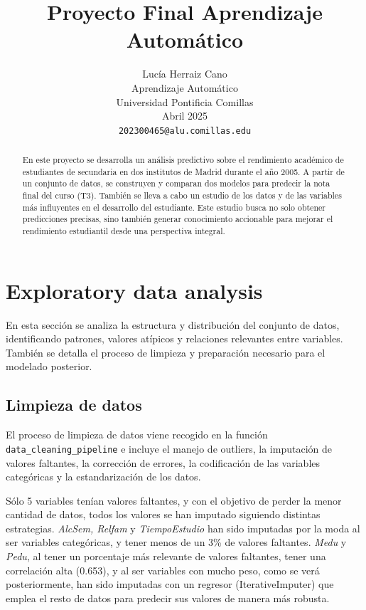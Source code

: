 \documentclass{article}
\title{Proyecto Final Aprendizaje Automático}
\author{%
    Lucía Herraiz Cano\\
    Aprendizaje Automático\\
    Universidad Pontificia Comillas\\
    Abril 2025\\
    \texttt{202300465@alu.comillas.edu} \\
}
\begin{document}
\maketitle


\begin{abstract}
  En este proyecto se desarrolla un análisis predictivo sobre el rendimiento 
  académico de estudiantes de secundaria en dos institutos de Madrid durante 
  el año 2005. A partir de un conjunto de datos, se construyen y comparan dos 
  modelos para predecir la nota final del curso (T3). También se lleva a cabo 
  un estudio de los datos y de las variables más influyentes en el desarrollo
  del estudiante. Este estudio busca no solo obtener predicciones precisas, 
  sino también generar conocimiento accionable para mejorar el rendimiento 
  estudiantil desde una perspectiva integral.
\end{abstract}


\section{Exploratory data analysis}


En esta sección se analiza la estructura y distribución del conjunto de datos, identificando patrones, valores atípicos y relaciones relevantes entre variables. También se detalla el proceso de limpieza y preparación necesario para el modelado posterior.


\subsection{Limpieza de datos}


El proceso de limpieza de datos viene recogido en la función \texttt{data\_cleaning\_pipeline}
e incluye el manejo de outliers, la imputación de valores faltantes, la corrección de errores, la codificación de las variables 
categóricas y la estandarización de los datos.

Sólo 5 variables tenían valores faltantes, y con el objetivo de perder la menor cantidad de datos, todos los valores se han imputado siguiendo distintas estrategias.
\textit{AlcSem, Relfam} y \textit{TiempoEstudio} han sido imputadas por la moda al ser variables categóricas, y tener menos de un 3\% de valores faltantes. \textit{Medu} y \textit{Pedu}, 
al tener un porcentaje más relevante de valores faltantes, tener una correlación alta (0.653), y al ser variables con mucho peso, como se verá posteriormente, han sido imputadas con un regresor (IterativeImputer) que emplea el resto de datos
para predecir sus valores de manera más robusta. 
\end{document}
